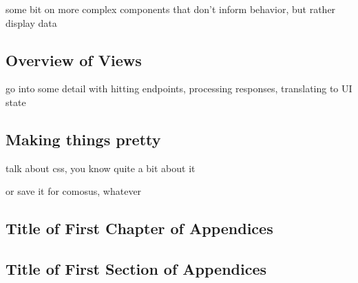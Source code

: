 \documentclass[11pt, twoside, reqno]{book}
\begin{document}
some bit on more complex components that don't inform behavior, but rather display data

\section{Overview of Views}

go into some detail with hitting endpoints, processing responses, translating to UI state

\section{Making things pretty}

talk about css, you know quite a bit about it

or save it for comosus, whatever

\begin{appendices}
\chapter{Title of First Chapter of Appendices}
\label{label}

\section{Title of First Section of Appendices}
\label{label}


\end{appendices}

\nocite{*}


\end{document}

